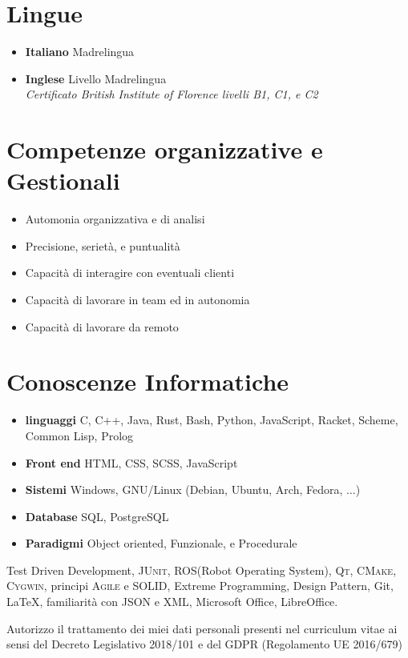 \documentclass[a4paper,12pt]{article}
\begin{document}
\section{Lingue}
\begin{itemize}
\item \textbf{Italiano} Madrelingua
\item \textbf{Inglese} Livello Madrelingua \\ \textit{Certificato British Institute of Florence livelli B1, C1, e C2}
\end{itemize}

\section{Competenze organizzative e Gestionali}
\begin{itemize}
\item Automonia organizzativa e di analisi
\item Precisione, serietà, e puntualità
\item Capacità di interagire con eventuali clienti
\item Capacità di lavorare in team ed in autonomia
\item Capacità di lavorare da remoto
\end{itemize}

\section{Conoscenze Informatiche}
\begin{itemize}
\item \textbf{linguaggi} C, C++, Java, Rust, Bash, Python, JavaScript, Racket, Scheme, Common Lisp, Prolog
\item \textbf{Front end} HTML, CSS, SCSS, JavaScript
\item \textbf{Sistemi} Windows, GNU/Linux (Debian, Ubuntu, Arch, Fedora, $\dots$)
\item \textbf{Database} SQL, PostgreSQL
\item \textbf{Paradigmi} Object oriented, Funzionale, e Procedurale
\end{itemize}
Test Driven Development, \textsc{JUnit}, \textsc{ROS}(Robot Operating System), \textsc{Qt}, \textsc{CMake}, \textsc{Cygwin}, principi \textsc{Agile} e \textsc{SOLID}, Extreme Programming, Design Pattern, Git, \LaTeX , familiarità con \textsc{JSON} e \textsc{XML}, Microsoft Office, LibreOffice.

\vfill

{\footnotesize Autorizzo il trattamento dei miei dati personali presenti nel curriculum vitae ai sensi del Decreto Legislativo 2018/101 e del GDPR (Regolamento UE 2016/679)}
\end{document}
